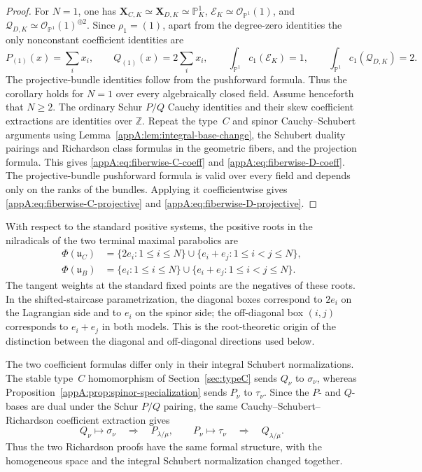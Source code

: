 \documentclass[11pt,a4paper,oneside]{amsart}
\numberwithin{equation}{section}
\theoremstyle{definition}
\theoremstyle{remark}
\begin{document}
\begin{proof}
For $N=1$, one has
$\mathbf X_{C,K}\simeq\mathbf X_{D,K}\simeq\mathbb P^1_K$,
$\mathcal E_K\simeq\mathcal O_{\mathbb P^1}(1)$, and
$\mathcal Q_{D,K}\simeq\mathcal O_{\mathbb P^1}(1)^{\oplus2}$.  Since
$\rho_1=(1)$, apart from the degree-zero identities the only nonconstant
coefficient identities are
\[
 P_{(1)}(x)=\sum_i x_i,\qquad Q_{(1)}(x)=2\sum_i x_i,
 \qquad
 \int_{\mathbb P^1}c_1(\mathcal E_K)=1,\qquad
 \int_{\mathbb P^1}c_1(\mathcal Q_{D,K})=2.
\]
The projective-bundle identities follow from the pushforward formula.  Thus
the corollary holds for $N=1$ over every algebraically closed field.  Assume
henceforth that $N\geq2$.
The ordinary Schur $P/Q$ Cauchy identities and their skew coefficient
extractions are identities over $\mathbb Z$.  Repeat the type~$C$ and
spinor Cauchy--Schubert arguments using
Lemma~\ref{appA:lem:integral-base-change}, the Schubert duality pairings and
Richardson class formulas in the geometric fibers, and the projection
formula.  This gives
\eqref{appA:eq:fiberwise-C-coeff} and
\eqref{appA:eq:fiberwise-D-coeff}.  The projective-bundle pushforward
formula is valid over every field and depends only on the ranks of the
bundles.  Applying it coefficientwise gives
\eqref{appA:eq:fiberwise-C-projective} and
\eqref{appA:eq:fiberwise-D-projective}.
\end{proof}

With respect to the standard positive systems, the positive roots in the
nilradicals of the two terminal maximal parabolics are
\begin{equation}
\label{appA:eq:nilradical-roots}
\begin{aligned}
  \Phi(\mathfrak u_C)
  &=\{2e_i:1\leq i\leq N\}
    \cup\{e_i+e_j:1\leq i<j\leq N\},\\
  \Phi(\mathfrak u_B)
  &=\{e_i:1\leq i\leq N\}
    \cup\{e_i+e_j:1\leq i<j\leq N\}.
\end{aligned}
\end{equation}
The tangent weights at the standard fixed points are the negatives of these
roots.  In the shifted-staircase parametrization, the diagonal boxes
correspond to $2e_i$ on the Lagrangian side and to $e_i$ on the spinor side;
the off-diagonal box $(i,j)$ corresponds to $e_i+e_j$ in both models.  This
is the root-theoretic origin of the distinction between the diagonal and
off-diagonal directions used below.

The two coefficient formulas differ only in their integral Schubert
normalizations.  The stable type~$C$ homomorphism of
Section~\ref{sec:typeC} sends $Q_\nu$ to $\sigma_\nu$, whereas
Proposition~\ref{appA:prop:spinor-specialization} sends $P_\nu$ to
$\tau_\nu$.  Since the $P$- and $Q$-bases are dual under the Schur $P/Q$
pairing, the same Cauchy--Schubert--Richardson coefficient extraction gives
\begin{equation}
\label{appA:eq:dual-skew-output}
  Q_\nu\longmapsto\sigma_\nu
  \quad\Longrightarrow\quad P_{\lambda/\mu},
  \qquad
  P_\nu\longmapsto\tau_\nu
  \quad\Longrightarrow\quad Q_{\lambda/\mu}.
\end{equation}
Thus the two Richardson proofs have the same formal structure, with the
homogeneous space and the integral Schubert normalization changed together.
\end{document}
